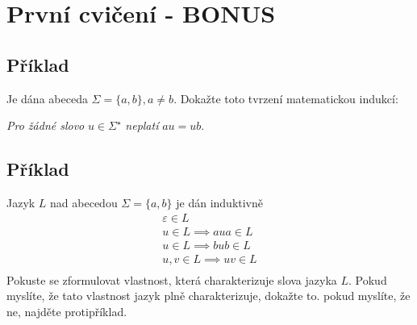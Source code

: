 \section{První cvičení - BONUS}

\subsection{Příklad}
Je dána abeceda $\Sigma = \{a,b\}, a \not= b$. Dokažte toto tvrzení matematickou indukcí:

\textit{Pro žádné slovo} $u \in \Sigma^\star$ \textit{neplatí} $au = ub$.


\subsection{Příklad}
Jazyk $L$ nad abecedou $\Sigma = \{a,b\}$ je dán induktivně
\begin{gather*}
    \varepsilon \in L \\
    u \in L \implies aua \in L\\
    u \in L \implies bub \in L\\
    u, v \in L \implies uv \in L\\
\end{gather*}
Pokuste se zformulovat vlastnost, která charakterizuje slova jazyka $L$. Pokud myslíte, že tato vlastnost jazyk plně
charakterizuje, dokažte to. pokud myslíte, že ne, najděte protipříklad.